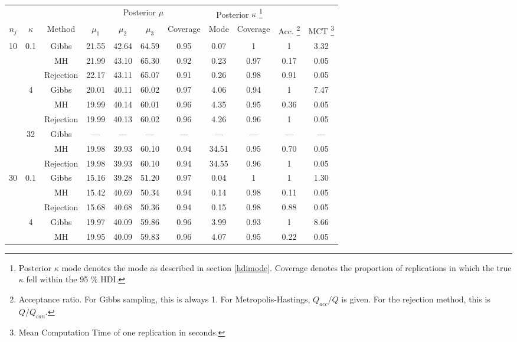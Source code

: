 {\footnotesize
\begin{tabular}{ccccccccccc}
  \toprule 
 &&& \multicolumn{4}{c}{Posterior $\mu$} & \multicolumn{2}{c}{Posterior $\kappa$ \footnote{Posterior $\kappa$ mode denotes the mode as described in section \ref{hdimode}. Coverage denotes the proportion of replications in which the true $\kappa$ fell within the 95 \% HDI.} }&  \\
   $n_j$ & $\kappa$ & Method & $\mu_1$ & $\mu_2$ & $\mu_3$ & Coverage & Mode & Coverage & Acc. \footnote{Acceptance ratio. For Gibbs sampling, this is always 1. For Metropolis-Hastings, $Q_{acc}/Q$ is given. For the rejection method, this is $Q/Q_{can}$.} & MCT \footnote{Mean Computation Time of one replication in seconds.} \\
 \midrule 
 10 & 0.1 & Gibbs & 21.55 & 42.64 & 64.59 & 0.95 & 0.07 & 1 & 1 & 3.32 \\ 
   &  & MH & 21.99 & 43.10 & 65.30 & 0.92 & 0.23 & 0.97 & 0.17 & 0.05 \\ 
   \vspace{0.2cm} &  & Rejection & 22.17 & 43.11 & 65.07 & 0.91 & 0.26 & 0.98 & 0.91 & 0.05 \\ 
   & 4 & Gibbs & 20.01 & 40.11 & 60.02 & 0.97 & 4.06 & 0.94 & 1 & 7.47 \\ 
   &  & MH & 19.99 & 40.14 & 60.01 & 0.96 & 4.35 & 0.95 & 0.36 & 0.05 \\ 
   \vspace{0.2cm} &  & Rejection & 19.99 & 40.13 & 60.02 & 0.96 & 4.26 & 0.96 & 1 & 0.05 \\ 
   & 32 & Gibbs & --- & --- & --- & --- & --- & --- & --- & --- \\ 
   &  & MH & 19.98 & 39.93 & 60.10 & 0.94 & 34.51 & 0.95 & 0.70 & 0.05 \\ 
   &  & Rejection & 19.98 & 39.93 & 60.10 & 0.94 & 34.55 & 0.96 & 1 & 0.05 \\ 
   \cmidrule{1-11} 
 30 & 0.1 & Gibbs & 15.16 & 39.28 & 51.20 & 0.97 & 0.04 & 1 & 1 & 1.30 \\ 
   &  & MH & 15.42 & 40.69 & 50.34 & 0.94 & 0.14 & 0.98 & 0.11 & 0.05 \\ 
   \vspace{0.2cm} &  & Rejection & 15.68 & 40.68 & 50.36 & 0.94 & 0.15 & 0.98 & 0.88 & 0.05 \\ 
   & 4 & Gibbs & 19.97 & 40.09 & 59.86 & 0.96 & 3.99 & 0.93 & 1 & 8.66 \\ 
   &  & MH & 19.95 & 40.09 & 59.83 & 0.96 & 4.07 & 0.95 & 0.22 & 0.05 \\ 

\end{tabular}}
